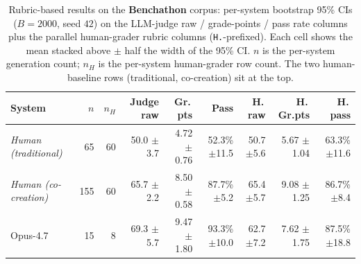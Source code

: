 \begin{table}[t]
\centering\footnotesize
\caption{Rubric-based results on the \textbf{Benchathon} corpus: per-system bootstrap 95\% CIs ($B=2000$, seed $42$) on the LLM-judge raw / grade-points / pass rate columns plus the parallel human-grader rubric columns (\texttt{H.}-prefixed). Each cell shows the mean stacked above $\pm$ half the width of the 95\% CI. $n$ is the per-system generation count; $n_H$ is the per-system human-grader row count. The two human-baseline rows (traditional, co-creation) sit at the top.}
\label{tbl-full-results-rubric-benchathon}
\setlength{\tabcolsep}{4pt}
\begin{tabular*}{\textwidth}{@{\extracolsep{\fill}}lrrrrrrrr@{}}
\toprule
System & $n$ & $n_H$ & Judge raw & Gr.\,pts & Pass & H.\,raw & H.\,Gr.pts & H.\,pass \\
\midrule
\textit{Human (traditional)} & 65 & 60 & \shortstack[r]{50.0\\{\scriptsize $\pm$3.7}} & \shortstack[r]{4.72\\{\scriptsize $\pm$0.76}} & \shortstack[r]{52.3\%\\{\scriptsize $\pm$11.5}} & \shortstack[r]{50.7\\{\scriptsize $\pm$5.6}} & \shortstack[r]{5.67\\{\scriptsize $\pm$1.04}} & \shortstack[r]{63.3\%\\{\scriptsize $\pm$11.6}} \\
\textit{Human (co-creation)} & 155 & 60 & \shortstack[r]{65.7\\{\scriptsize $\pm$2.2}} & \shortstack[r]{8.50\\{\scriptsize $\pm$0.58}} & \shortstack[r]{87.7\%\\{\scriptsize $\pm$5.2}} & \shortstack[r]{65.4\\{\scriptsize $\pm$5.7}} & \shortstack[r]{9.08\\{\scriptsize $\pm$1.25}} & \shortstack[r]{86.7\%\\{\scriptsize $\pm$8.4}} \\
Opus-4.7 & 15 & 8 & \shortstack[r]{69.3\\{\scriptsize $\pm$5.7}} & \shortstack[r]{9.47\\{\scriptsize $\pm$1.80}} & \shortstack[r]{93.3\%\\{\scriptsize $\pm$10.0}} & \shortstack[r]{62.7\\{\scriptsize $\pm$7.2}} & \shortstack[r]{7.62\\{\scriptsize $\pm$1.75}} & \shortstack[r]{87.5\%\\{\scriptsize $\pm$18.8}} \\

\end{tabular*}
\end{table}
